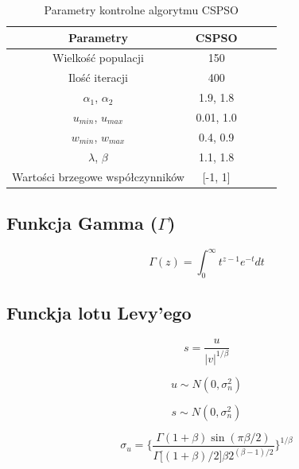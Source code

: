 \documentclass[eng, pl, oneside, openright, final, openbib]{mgr}\DeclareUnicodeCharacter{0301}{\'{e}}
\begin{document}
\begin{table}[ht]
\caption{Parametry kontrolne algorytmu CSPSO} %
\label{table:4_1}
\centering %
\begin{tabular}{c c c c c} %
\hline\hline %
Parametry & CSPSO\\ [0.5ex] %
\hline %
Wielkość populacji & 150\\ %
Ilość iteracji & 400\\
$\alpha_{1}$, $\alpha_{2}$ & 1.9, 1.8\\
$u_{min}$, $u_{max}$ & 0.01, 1.0\\
$w_{min}$, $w_{max}$ & 0.4, 0.9\\ [1ex] %

$\lambda$, $\beta$ & 1.1, 1.8 \\
Wartości brzegowe współczynników & [-1, 1]\\
\hline %
\end{tabular}
\label{table:nonlin} %
\end{table}
\subsection{Funkcja Gamma ($\Gamma$)}

\begin{equation}
	\Gamma(z) = \int_{0}^{\infty} t^{z - 1}e^{-t}dt
	\label{eq:gamma}
\end{equation}
\subsection{Funckja lotu Levy'ego}
\begin{equation}
	s = \frac{u}{\vert v\vert^{1 / \beta}} 
\end{equation}

\begin{equation}
 u \sim N(0, \sigma^{2}_{n})
\end{equation}

\begin{equation}
 s \sim N(0, \sigma^{2}_{n})
\end{equation}

\begin{equation}
	\sigma_{u} =\lbrace \frac{\Gamma(1 + \beta) \sin{(\pi \beta / 2)}}{\Gamma\lbrack(1 + \beta) /2\rbrack \beta 2 ^{(\beta - 1) / 2}}\rbrace^{1 / \beta}
\end{equation}
\end{document}
